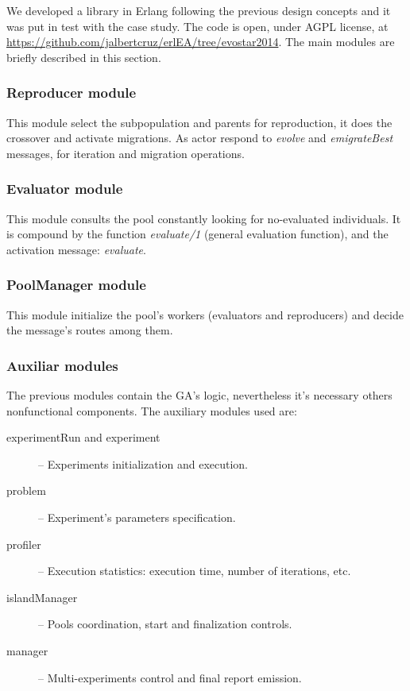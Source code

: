 
We developed a library in Erlang following the previous design concepts and it was put in test with the case study. The code is open, under AGPL license, at \url{https://github.com/jalbertcruz/erlEA/tree/evostar2014}. The main modules are briefly described in this section.

\subsubsection{Reproducer module}

This module select the subpopulation and parents for reproduction, it does the crossover and activate migrations. As actor respond to {\em evolve} and {\em emigrateBest} messages, for iteration and migration operations.

\subsubsection{Evaluator module}

This module consults the pool constantly looking for no-evaluated individuals. It is compound by the function {\em evaluate/1} (general evaluation function), and the activation message: {\em evaluate}.

\subsubsection{PoolManager module}

This module initialize the pool’s workers (evaluators and reproducers) and decide the message’s routes among them.

\subsubsection{Auxiliar modules}

The previous modules contain the GA’s logic, nevertheless it’s necessary others nonfunctional components. The auxiliary modules used are:
\vspace{.35cm}

\begin{description}

  \item[experimentRun and experiment] -- Experiments initialization and execution.

  \item[problem] -- Experiment’s parameters specification.

  \item[profiler] -- Execution statistics: execution time, number of iterations, etc.

  \item[islandManager] -- Pools coordination, start and finalization controls.

  \item[manager] -- Multi-experiments control and final report emission.

\end{description} 